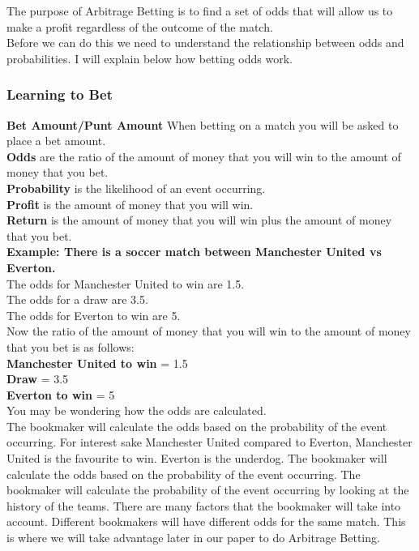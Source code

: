 The purpose of Arbitrage Betting is to find a set of odds that will allow us to make a profit regardless of the outcome of the match. \\

Before we can do this we need to understand the relationship between odds and probabilities. I will explain below how betting odds work. \\

\subsubsection{Learning to Bet}

\textbf{Bet Amount/Punt Amount} When betting on a match you will be asked to place a bet amount. \\
\textbf{Odds} are the ratio of the amount of money that you will win to the amount of money that you bet. \\
\textbf{Probability} is the likelihood of an event occurring. \\
\textbf{Profit} is the amount of money that you will win. \\
\textbf{Return} is the amount of money that you will win plus the amount of money that you bet. \\

\textbf{Example: There is a soccer match between Manchester United vs Everton.} \\

The odds for Manchester United to win are 1.5. \\
The odds for a draw are 3.5. \\
The odds for Everton to win are 5. \\

Now the ratio of the amount of money that you will win to the amount of money that you bet is as follows: \\

\textbf{Manchester United to win} = 1.5 \\
\textbf{Draw} = 3.5 \\
\textbf{Everton to win} = 5 \\

You may be wondering how the odds are calculated. \\

The bookmaker will calculate the odds based on the probability of the event occurring. 
For interest sake Manchester United compared to Everton, Manchester United is the favourite to win. Everton is the underdog. 
The bookmaker will calculate the odds based on the probability of the event occurring. 
The bookmaker will calculate the probability of the event occurring by looking at the history of the teams. There are many factors that the bookmaker will take into account. 
Different bookmakers will have different odds for the same match. This is where we will take advantage later in our paper to do Arbitrage Betting. \\

